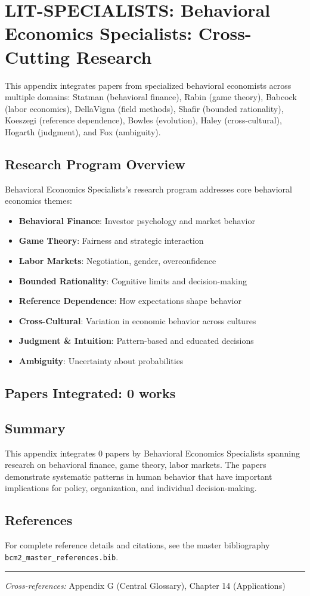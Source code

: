 \section{LIT-SPECIALISTS: Behavioral Economics Specialists: Cross-Cutting Research}
\label{app:litad}

This appendix integrates papers from specialized behavioral economists
across multiple domains: Statman (behavioral finance), Rabin (game theory), Babcock
(labor economics), DellaVigna (field methods), Shafir (bounded rationality), Koeszegi
(reference dependence), Bowles (evolution), Haley (cross-cultural), Hogarth (judgment),
and Fox (ambiguity).

\subsection{Research Program Overview}

Behavioral Economics Specialists's research program addresses core behavioral economics themes:

\begin{itemize}
  \item \textbf{Behavioral Finance}: Investor psychology and market behavior
  \item \textbf{Game Theory}: Fairness and strategic interaction
  \item \textbf{Labor Markets}: Negotiation, gender, overconfidence
  \item \textbf{Bounded Rationality}: Cognitive limits and decision-making
  \item \textbf{Reference Dependence}: How expectations shape behavior
  \item \textbf{Cross-Cultural}: Variation in economic behavior across cultures
  \item \textbf{Judgment & Intuition}: Pattern-based and educated decisions
  \item \textbf{Ambiguity}: Uncertainty about probabilities
\end{itemize}

\subsection{Papers Integrated: 0 works}

\subsection{Summary}

This appendix integrates 0 papers by Behavioral Economics Specialists
spanning research on behavioral finance, game theory, labor markets.
The papers demonstrate systematic patterns in human behavior that have important
implications for policy, organization, and individual decision-making.

\subsection{References}

For complete reference details and citations, see the master bibliography
\texttt{bcm2\_master\_references.bib}.

\vspace{1em}
\hrule
\vspace{0.5em}

\noindent\textit{Cross-references:}
Appendix G (Central Glossary), Chapter 14 (Applications)
